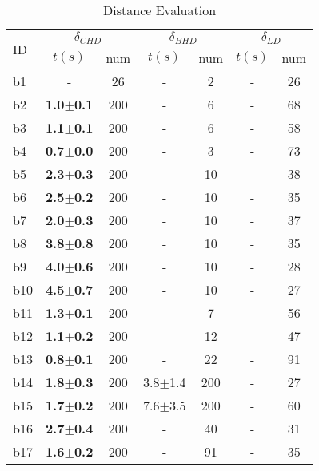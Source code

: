 \begin{longtable}{|l|c|c|c|c|c|c|}
\caption{\label{tab:distances}{Distance Evaluation}}\\
\hline
\multirow{2}{*}{ID}&\multicolumn{2}{c|}{$\delta_{CHD}$}&\multicolumn{2}{c|}{$\delta_{BHD}$}&\multicolumn{2}{c|}{$\delta_{LD}$}\\
\cline{2-7}
&$t(s)$&num&$t(s)$&num&$t(s)$&num\\
\hline
b1&- & 26&- & 2&- & 26
\\
b2&\textbf{1.0$\pm$0.1} & 200 &- & 6&- & 68
\\
b3&\textbf{1.1$\pm$0.1} & 200 &- & 6&- & 58
\\
b4&\textbf{0.7$\pm$0.0} & 200 &- & 3&- & 73
\\
b5&\textbf{2.3$\pm$0.3} & 200 &- & 10&- & 38
\\
b6&\textbf{2.5$\pm$0.2} & 200 &- & 10&- & 35
\\
b7&\textbf{2.0$\pm$0.3} & 200 &- & 10&- & 37
\\
b8&\textbf{3.8$\pm$0.8} & 200 &- & 10&- & 35
\\
b9&\textbf{4.0$\pm$0.6} & 200 &- & 10&- & 28
\\
b10&\textbf{4.5$\pm$0.7} & 200 &- & 10&- & 27
\\
b11&\textbf{1.3$\pm$0.1} & 200 &- & 7&- & 56
\\
b12&\textbf{1.1$\pm$0.2} & 200 &- & 12&- & 47
\\
b13&\textbf{0.8$\pm$0.1} & 200 &- & 22&- & 91
\\
b14&\textbf{1.8$\pm$0.3} & 200 &3.8$\pm$1.4 & 200 &- & 27
\\
b15&\textbf{1.7$\pm$0.2} & 200 &7.6$\pm$3.5 & 200 &- & 60
\\
b16&\textbf{2.7$\pm$0.4} & 200 &- & 40&- & 31
\\
b17&\textbf{1.6$\pm$0.2} & 200 &- & 91&- & 35
\\
\hline
\end{longtable}
